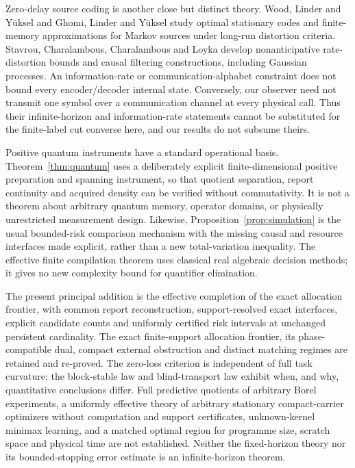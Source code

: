 Zero-delay source coding is another close but distinct theory. Wood, Linder and Y\"uksel\cite{wood} and Ghomi, Linder and Y\"uksel\cite{ghomi} study optimal stationary codes and finite-memory approximations for Markov sources under long-run distortion criteria. Stavrou, Charalambous, Charalambous and Loyka\cite{stavrou} develop nonanticipative rate-distortion bounds and causal filtering constructions, including Gaussian processes. An information-rate or communication-alphabet constraint does not bound every encoder/decoder internal state. Conversely, our observer need not transmit one symbol over a communication channel at every physical call. Thus their infinite-horizon and information-rate statements cannot be substituted for the finite-label cut converse here, and our results do not subsume theirs.

Positive quantum instruments have a standard operational basis\cite{davies}. Theorem~\ref{thm:quantum} uses a deliberately explicit finite-dimensional positive preparation and spanning instrument, so that quotient separation, report continuity and acquired density can be verified without commutativity. It is not a theorem about arbitrary quantum memory, operator domains, or physically unrestricted measurement design. Likewise, Proposition~\ref{prop:simulation} is the usual bounded-risk comparison mechanism\cite{lecam} with the missing causal and resource interfaces made explicit, rather than a new total-variation inequality. The effective finite compilation theorem uses classical real algebraic decision methods\cite{bpr}; it gives no new complexity bound for quantifier elimination.

The present principal addition is the effective completion of the exact allocation frontier, with common report reconstruction, support-resolved exact interfaces, explicit candidate counts and uniformly certified risk intervals at unchanged persistent cardinality. The exact finite-support allocation frontier, its phase-compatible dual, compact external obstruction and distinct matching regimes are retained and re-proved. The zero-loss criterion is independent of full task curvature; the block-stable law and blind-transport law exhibit when, and why, quantitative conclusions differ. Full predictive quotients of arbitrary Borel experiments, a uniformly effective theory of arbitrary stationary compact-carrier optimizers without computation and support certificates, unknown-kernel minimax learning, and a matched optimal region for programme size, scratch space and physical time are not established. Neither the fixed-horizon theory nor its bounded-stopping error estimate is an infinite-horizon theorem.
